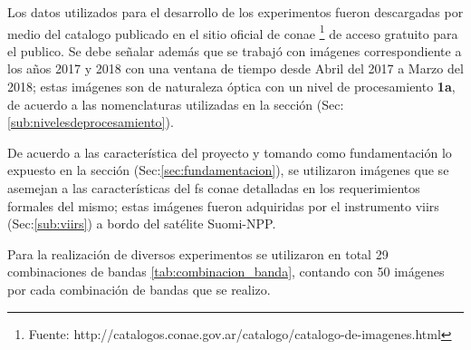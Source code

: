 Los datos utilizados para el desarrollo de los experimentos fueron descargadas por medio del catalogo  publicado en el sitio oficial de \ac{conae} \footnote{Fuente: http://catalogos.conae.gov.ar/catalogo/catalogo-de-imagenes.html} de acceso gratuito para el publico. Se debe señalar además que se trabajó con imágenes correspondiente a los años 2017 y 2018 con una ventana de tiempo desde Abril del 2017 a Marzo del 2018; estas imágenes son de naturaleza óptica con un nivel de procesamiento \textbf{1a}, de acuerdo a las nomenclaturas utilizadas en la sección (Sec:\ref{sub:nivelesdeprocesamiento}).

De acuerdo a las característica del proyecto y tomando como fundamentación lo expuesto en la sección (Sec:\ref{sec:fundamentacion}), se utilizaron imágenes que se asemejan a las características del \ac{fs} \ac{conae} detalladas en los requerimientos formales del mismo; estas imágenes fueron adquiridas por el instrumento \ac{viirs} (Sec:\ref{sub:viirs}) a bordo del satélite Suomi-NPP.


Para la realización de diversos experimentos se utilizaron en total 29 combinaciones de bandas \ref{tab:combinacion_banda}, contando con 50 imágenes por cada combinación de bandas que se realizo.



